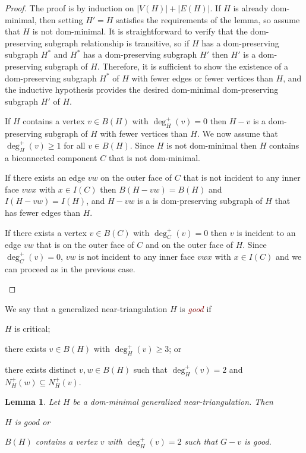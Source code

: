 \documentclass[12pt]{article}
\newtheorem{lem}{Lemma}
\newcommand{\defin}[1]{\emph{\textcolor{Maroon}{#1}}}
\begin{document}
\begin{proof}
  The proof is by induction on $|V(H)|+|E(H)|$.  If $H$ is already dom-minimal, then setting $H'=H$ satisfies the requirements of the lemma, so assume that $H$ is not dom-minimal.  It is straightforward to verify that the dom-preserving subgraph relationship is transitive, so if $H$ has a dom-preserving subgraph $H^*$ and $H^*$ has a dom-preserving subgraph $H'$ then $H'$ is a dom-preserving subgraph of $H$.  Therefore, it is sufficient to show the existence of a dom-preserving subgraph $H^*$ of $H$ with fewer edges or fewer vertices than $H$, and the inductive hypothesis provides the desired dom-minimal dom-preserving subgraph $H'$ of $H$.

  If $H$ contains a vertex $v\in B(H)$ with $\deg^+_H(v)=0$ then $H-v$ is a dom-preserving subgraph of $H$ with fewer vertices than $H$.  We now assume that $\deg^+_H(v)\ge 1$ for all $v\in B(H)$.  Since $H$ is not dom-minimal then $H$ contains a biconnected component $C$ that is not dom-minimal.
  \begin{compactenum}
    \item If there exists an edge $vw$ on the outer face of $C$ that is not incident to any inner face $vwx$ with $x\in I(C)$ then $B(H-vw)=B(H)$ and $I(H-vw)=I(H)$, and $H-vw$ is a is dom-preserving subgraph of $H$ that has fewer edges than $H$.

    \item If there exists a vertex $v\in B(C)$ with $\deg^+_C(v)=0$ then $v$ is incident to an edge $vw$ that is on the outer face of $C$ and on the outer face of $H$. Since $\deg^+_C(v)=0$, $vw$ is not incident to any inner face $vwx$ with $x\in I(C)$ and we can proceed as in the previous case. \qedhere
  \end{compactenum}
\end{proof}

We say that a generalized near-triangulation $H$ is \defin{good} if
\begin{compactenum}[(G1)]
      \item $H$ is critical;
      \item there exists $v\in B(H)$ with $\deg^+_H(v)\ge 3$; or
      \item there exists distinct $v,w\in B(H)$ such that $\deg^+_H(v)=2$ and $N^+_H(w)\subseteq N^+_H(v)$.
\end{compactenum}

\begin{lem}\label{not_good}
  Let $H$ be a dom-minimal generalized near-triangulation.  Then \begin{compactenum}[(i)]
    \item $H$ is good or
    \item $B(H)$ contains a vertex $v$ with $\deg^+_H(v)=2$ such that $G-v$ is good.
  \end{compactenum}
\end{lem}
\end{document}
